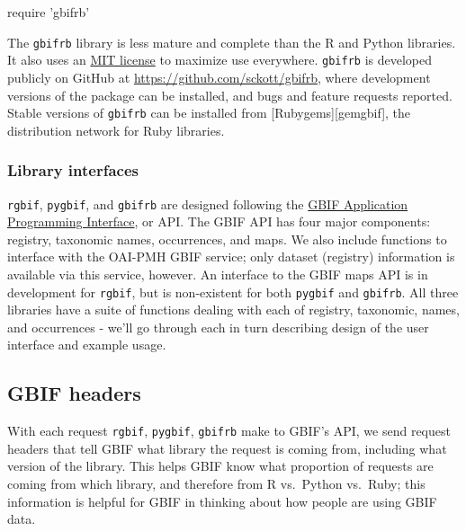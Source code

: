 \documentclass[author-year, review, 11pt]{components/elsarticle} %
\newenvironment{Shaded}{\begin{snugshade}}{\end{snugshade}}
\newcommand{\StringTok}[1]{\textcolor[rgb]{0.31,0.60,0.02}{#1}}
\newcommand{\NormalTok}[1]{#1}
\begin{document}
\begin{Shaded}
\begin{Highlighting}[]
\NormalTok{require }\StringTok{'gbifrb'}
\end{Highlighting}
\end{Shaded}

The \texttt{gbifrb} library is less mature and complete than the R and
Python libraries. It also uses an
\href{http://choosealicense.com/licenses/mit/}{MIT license} to maximize
use everywhere. \texttt{gbifrb} is developed publicly on GitHub at
\url{https://github.com/sckott/gbifrb}, where development versions of
the package can be installed, and bugs and feature requests reported.
Stable versions of \texttt{gbifrb} can be installed from
{[}Rubygems{]}{[}gemgbif{]}, the distribution network for Ruby
libraries.

\subsubsection{Library interfaces}\label{library-interfaces}

\texttt{rgbif}, \texttt{pygbif}, and \texttt{gbifrb} are designed
following the \href{http://www.gbif.org/developer/summary}{GBIF
Application Programming Interface}, or API. The GBIF API has four major
components: registry, taxonomic names, occurrences, and maps. We also
include functions to interface with the OAI-PMH GBIF service; only
dataset (registry) information is available via this service, however.
An interface to the GBIF maps API is in development for \texttt{rgbif},
but is non-existent for both \texttt{pygbif} and \texttt{gbifrb}. All
three libraries have a suite of functions dealing with each of registry,
taxonomic, names, and occurrences - we'll go through each in turn
describing design of the user interface and example usage.

\subsection{GBIF headers}\label{gbif-headers}

With each request \texttt{rgbif}, \texttt{pygbif}, \texttt{gbifrb} make
to GBIF's API, we send request headers that tell GBIF what library the
request is coming from, including what version of the library. This
helps GBIF know what proportion of requests are coming from which
library, and therefore from R vs.~Python vs.~Ruby; this information is
helpful for GBIF in thinking about how people are using GBIF data.
\end{document}
